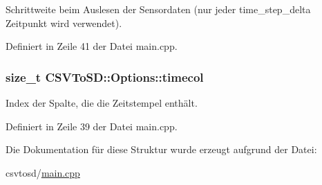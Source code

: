 Schrittweite beim Auslesen der Sensordaten (nur jeder time\-\_\-step\-\_\-delta Zeitpunkt wird verwendet). 



Definiert in Zeile 41 der Datei main.\-cpp.

\hypertarget{structCSVToSD_1_1Options_a1ffaee2ce48d0c2b8db1eaca858cdbc0}{
\subsubsection[{timecol}]{\setlength{\rightskip}{0pt plus 5cm}size\-\_\-t C\-S\-V\-To\-S\-D\-::\-Options\-::timecol}}\label{structCSVToSD_1_1Options_a1ffaee2ce48d0c2b8db1eaca858cdbc0}


Index der Spalte, die die Zeitstempel enthält. 



Definiert in Zeile 39 der Datei main.\-cpp.



Die Dokumentation für diese Struktur wurde erzeugt aufgrund der Datei\-:\begin{DoxyCompactItemize}
\item 
csvtosd/\hyperlink{csvtosd_2main_8cpp}{main.\-cpp}\end{DoxyCompactItemize}
